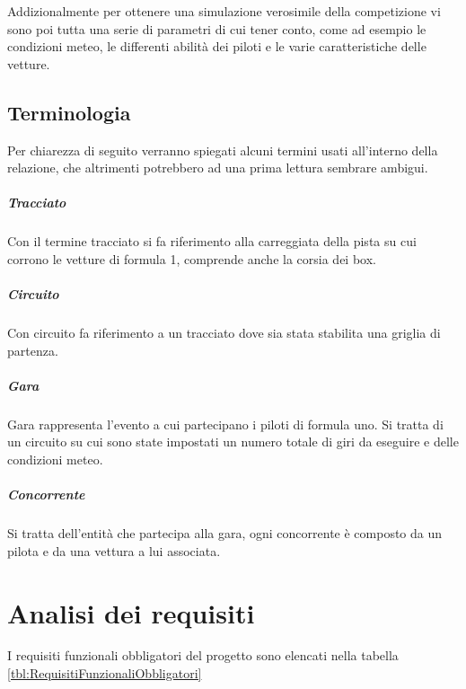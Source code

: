 \documentclass[a4paper,11pt, twoside]{book}
\begin{document}
      Addizionalmente per ottenere una simulazione verosimile
      della competizione 
      vi sono poi tutta una serie di parametri di cui tener conto, 
      come ad esempio le condizioni meteo, le differenti abilità dei piloti e le varie caratteristiche 
      delle vetture.

      
    
    \section{Terminologia}
      Per chiarezza di seguito verranno spiegati alcuni termini usati all'interno della relazione, 
      che altrimenti potrebbero ad una prima lettura sembrare ambigui.
      
      \paragraph{Tracciato}
        Con il termine tracciato si fa riferimento alla carreggiata della pista su cui corrono le vetture di formula 1, 
	comprende anche la corsia dei box.
      
      \paragraph{Circuito}
        Con circuito fa riferimento a un tracciato dove sia stata stabilita una griglia di partenza.
	
      \paragraph{Gara}
        Gara rappresenta l'evento a cui partecipano i piloti di formula uno. Si tratta di un circuito
	su cui sono state impostati un numero totale di giri da eseguire e delle condizioni meteo.
	
      \paragraph{Concorrente}
        Si tratta dell'entità che partecipa alla gara, ogni concorrente è composto da un pilota e da una vettura
	a lui associata.
        
  \chapter{Analisi dei requisiti}
    I requisiti funzionali obbligatori del progetto sono elencati nella tabella \ref{tbl:RequisitiFunzionaliObbligatori}
    
\end{document}
